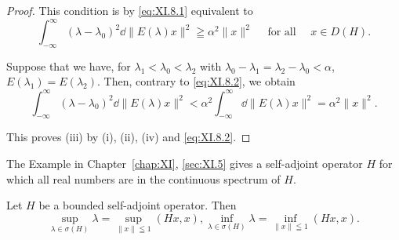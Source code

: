\begin{proof}
This condition is by \eqref{eq:XI.8.1} equivalent to 
\begin{equation}\label{eq:XI.8.2}
\int_{- \infty} ^{\infty} (\lambda - \lambda_{0}) ^{2} \dd \| E (\lambda) x \| ^{2} \geqq \alpha^{2} \| x \| ^{2} \quad \text{ for all } \quad x \in D (H).
\end{equation}

Suppose that we have, for $\lambda_1 < \lambda_0 < \lambda_2$ with $\lambda_0 - \lambda_1 = \lambda_2 - \lambda_0 < \alpha$, $E(\lambda_1) = E(\lambda_2)$. Then, contrary to \eqref{eq:XI.8.2}, we obtain 
\[
\int_{- \infty} ^{\infty} (\lambda - \lambda_{0}) ^{2} \dd \| E (\lambda) x \| ^{2} < \alpha^{2} \int_{- \infty} ^{\infty} \dd \| E (\lambda) x \| ^{2} = \alpha^{2} \| x \| ^{2}.
\]

This proves (iii) by (i), (ii), (iv) and \eqref{eq:XI.8.2}.
\end{proof}

\begin{remarku} The Example in Chapter~\ref{chap:XI}, \ref{sec:XI.5} gives a self-adjoint operator $H$ for which all real numbers are in the continuous spectrum of $H$. 
\end{remarku}

\begin{theorem}\label{thm:XI.8.Theorem.2} Let $H$ be a bounded self-adjoint operator. Then 
\begin{equation}\label{eq:XI.8.3}
\sup\limits _{\lambda \in \sigma (H)} \lambda = \sup\limits _{\| x \| \leqq 1} (H x, x), \inf\limits _{\lambda \in \sigma (H)} \lambda = \inf\limits _{\| x \| \leqq 1} (H x, x).
\end{equation}
\end{theorem}

